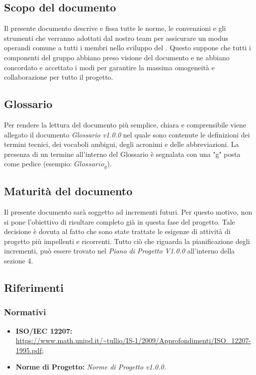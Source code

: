\subsection{Scopo del documento}
Il presente documento descrive e fissa tutte le norme, le convenzioni e gli strumenti che verranno adottati dal nostro team per assicurare un modus operandi comune a tutti i membri nello sviluppo del . Questo suppone che tutti i componenti del gruppo abbiano preso visione del documento e ne abbiano concordato e accettato i modi per garantire la massima omogeneità e collaborazione per tutto il progetto. 
\subsection{Glossario}
Per rendere la lettura del documento più semplice, chiara e comprensibile viene allegato il documento \emph{Glossario v1.0.0} nel quale sono contenute le definizioni dei termini tecnici, dei vocaboli ambigui, degli acronimi e delle abbreviazioni. La presenza di un termine all'interno del Glossario è segnalata con una "g" posta come pedice (esempio: $Glossario_{g}$).  
\subsection{Maturità del documento}
Il presente documento sarà soggetto ad incrementi futuri. Per questo motivo, non si pone l'obiettivo di risultare completo già in questa fase del progetto.
Tale decisione è dovuta al fatto che sono state trattate le esigenze di attività di progetto più impellenti e ricorrenti.
Tutto ciò che riguarda la pianificazione degli incrementi, può essere trovato nel \emph{Piano di Progetto V1.0.0} all'interno della sezione 4.
\subsection{Riferimenti}
\subsubsection{Normativi}
\begin{itemize}
	\item \textbf{ISO/IEC 12207:}\\ \url{https://www.math.unipd.it/~tullio/IS-1/2009/Approfondimenti/ISO_12207-1995.pdf};
	\item \textbf{Norme di Progetto:} \emph{Norme di Progetto v1.0.0.}
\end{itemize}
